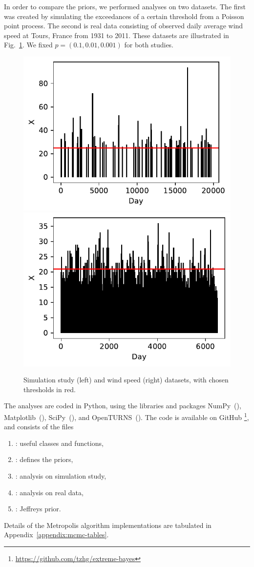 \documentclass{article}
\begin{document}
%
In order to compare the priors, we performed analyses on two
datasets.
The first was created by simulating the exceedances of a certain threshold
from a Poisson point process.
The second is real data consisting of observed daily average wind speed at
Tours, France from 1931 to 2011.
These datasets are illustrated in Fig.~\ref{fig:data}.
We fixed $p = (0.1, 0.01, 0.001)$ for both studies.
%
\begin{figure}
	\centering
	\includegraphics[width=0.49\linewidth]{plots/ppp-data.pdf}
	\includegraphics[width=0.49\linewidth]{plots/ws-data.pdf}
	\caption{Simulation study (left) and wind speed (right) datasets, with
		chosen thresholds in red.}
	\label{fig:data}
\end{figure}
%

%
The analyses are coded in Python, using the libraries and packages
NumPy~(\cite{numpy}), Matplotlib~(\cite{matplotlib}),
SciPy~(\cite{scipy}), and OpenTURNS~(\cite{OpenTURNS}).
The code is available on GitHub
\footnote{\url{https://github.com/tzhg/extreme-bayes}},
and consists of the files
%
\begin{enumerate}
	\item {}: useful classes and functions,
	\item {}: defines the priors,
	\item {}: analysis on simulation study,
	\item {}: analysis on real data,
	\item {}: Jeffreys prior.
\end{enumerate}
%
Details of the Metropolis algorithm implementations
are tabulated in Appendix~\ref{appendix:mcmc-tables}.
%
\end{document}
